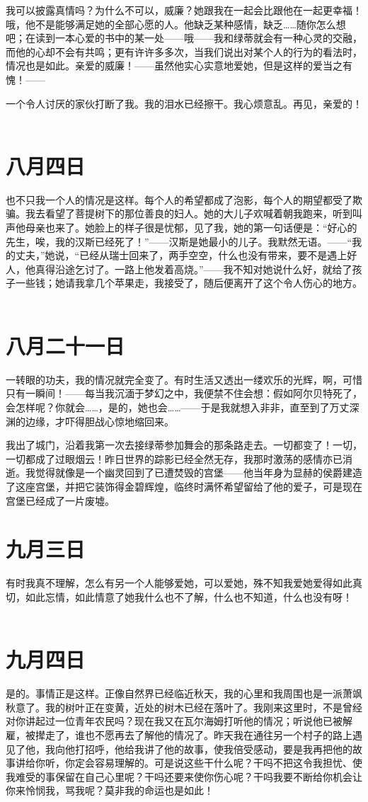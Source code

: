 \documentclass[12pt,oneside]{book}
\begin{document}
我可以披露真情吗？为什么不可以，威廉？她跟我在一起会比跟他在一起更幸福！哦，他不是能够满足她的全部心愿的人。他缺乏某种感情，缺乏……随你怎么想吧；在读到一本心爱的书中的某一处——哦——我和绿蒂就会有一种心灵的交融，而他的心却不会有共鸣；更有许许多多次，当我们说出对某个人的行为的看法时，情况也是如此。亲爱的威廉！——虽然他实心实意地爱她，但是这样的爱当之有愧！——

一个令人讨厌的家伙打断了我。我的泪水已经擦干。我心烦意乱。再见，亲爱的！
　　
\chapter{八月四日}
也不只我一个人的情况是这样。每个人的希望都成了泡影，每个人的期望都受了欺骗。我去看望了菩提树下的那位善良的妇人。她的大儿子欢喊着朝我跑来，听到叫声他母亲也来了。她脸上的样子很是忧郁，见了我，她的第一句话便是：“好心的先生，唉，我的汉斯已经死了！”——汉斯是她最小的儿子。我默然无语。——“我的丈夫，”她说，“已经从瑞士回来了，两手空空，什么也没有带来，要不是遇上好人，他真得沿途乞讨了。一路上他发着高烧。”——我不知对她说什么好，就给了孩子一些钱；她请我拿几个苹果走，我接受了，随后便离开了这个令人伤心的地方。
　　

\chapter{八月二十一日}
一转眼的功夫，我的情况就完全变了。有时生活又透出一缕欢乐的光辉，啊，可惜只有一瞬间！——每当我沉湎于梦幻之中，我便禁不住会想：假如阿尔贝特死了，会怎样呢？你就会……，是的，她也会……——于是我就想入非非，直至到了万丈深渊的边缘，才吓得胆战心惊地缩回来。

我出了城门，沿着我第一次去接绿蒂参加舞会的那条路走去。一切都变了！一切，一切都成了过眼烟云！昨日世界的踪影已经全然无存，我那时激荡的感情亦已消逝。我觉得就像是一个幽灵回到了已遭焚毁的宫堡——他当年身为显赫的侯爵建造了这座宫堡，并把它装饰得金碧辉煌，临终时满怀希望留给了他的爱子，可是现在宫堡已经成了一片废墟。
　　
\chapter{九月三日}
有时我真不理解，怎么有另一个人能够爱她，可以爱她，殊不知我爱她爱得如此真切，如此忘情，如此情意了她我什么也不了解，什么也不知道，什么也没有呀！
　　

\chapter{九月四日}
是的。事情正是这样。正像自然界已经临近秋天，我的心里和我周围也是一派萧飒秋意了。我的树叶正在变黄，近处的树木已经在落叶了。我刚来这里时，不是曾经对你讲起过一位青年农民吗？现在我又在瓦尔海姆打听他的情况；听说他已被解雇，被撵走了，谁也不愿再去了解他的情况了。昨天我在通往另一个村子的路上遇见了他，我向他打招呼，他给我讲了他的故事，使我倍受感动，要是我再把他的故事讲给你听，你定会容易理解的。可是说这些干什么呢？干吗不把这令我担忧、使我难受的事保留在自己心里呢？干吗还要来使你伤心呢？干吗我要不断给你机会让你来怜悯我，骂我呢？莫非我的命运也是如此！
\end{document}
